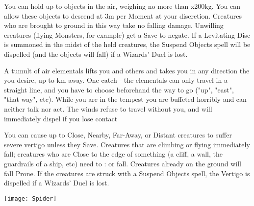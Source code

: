 {You can hold up to \DICE objects in the air, weighing no more than \DICE
x200kg.  You can allow these objects to descend at 3m per Moment at your
discretion. Creatures who are brought to ground in this way take no falling
damage.  Unwilling creatures (flying Monsters, for example) get a Save to
negate.  If a Levitating Disc is summoned in the midst of the held
creatures, the Suspend Objects spell will be dispelled (and the objects will
fall) if a Wizards' Duel is lost.




\SPELL[
  Name=Tempestuous Chariot,
  Link=wizardry-tempestuous-chariot,
  Paradigm=Elements,
  Save=N,
  Duration=One trip,
  Counter=None ,
  Keywords=None,
  Target=Close
]



A tumult of air elementals lifts you and  others and takes you in any
direction the you desire, up to \SUMDICE km away.   One catch - the
elementals can only travel in a straight line, and you have to choose
beforehand the way to go ("up", "east", "that way", etc).  While you are in
the tempest you are buffeted horribly and can neither talk nor act.  The
winds refuse to travel without you, and will immediately dispel if you lose
contact




\SPELL[
  Name=Vertigo,
  Link=wizardry-vertigo,
  Paradigm=Mind,
  Save=Y (negate),
  Duration=Markovian,
  Counter=\mylink{Suspend Objects}{wizardry-suspend-objects} ,
  Keywords=None,
  Target= Any Distance
]



You can cause up to \DICE Close, Nearby, Far-Away, or Distant creatures to
suffer severe vertigo unless they Save.  Creatures that are climbing or
flying immediately fall; creatures who are Close to the edge of something (a
cliff, a wall, the guardrails of a ship, etc) need to \RS : \FOC or fall.
Creatures already on the ground will fall Prone.  If the creatures are
struck with a Suspend Objects spell, the Vertigo is dispelled if a Wizards'
Duel is lost.




  \begin{center}
  \texttt{[image: Spider]}
  \end{center}


\SPELL[
  Name=Web,
  Link=wizardry-web,
  Paradigm=Entropy,
  Save=Y (negate),
  Duration=Markovian,
  Counter=None ,
  Keywords=None,
  Target=Nearby or Far Away Area
]



}
